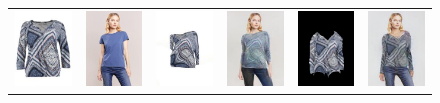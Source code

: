 \begin{figure}[t]
\begin{tabular}{cc|cc|cc}
\includegraphics[width=2cm]{figures/cloth/016962_1.jpg}&
\includegraphics[width=2cm]{figures/image/005379_0.jpg}&
\includegraphics[width=2cm]{figures/cp-vton/warp-cloth/016962_1_005379_0.jpg}&
\includegraphics[width=2cm]{figures/cp-vton/try-on/016962_1_005379_0.jpg}&
\includegraphics[width=2cm]{figures/c3dwfull/016962_1_005379_0.png}&
\includegraphics[width=2cm]{figures/try-on/016962_1_005379_0.jpg}\\


\end{tabular}
\end{figure}
